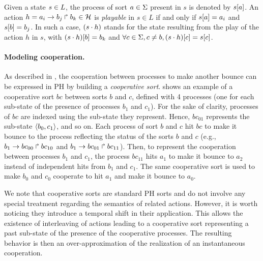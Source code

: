 \noindent
Given a state $s\in L$, the process of sort $a\in\Sigma$ present in $s$ is denoted by ${s[a]}$.
An action $h=a_i\rightarrow b_j\Rsh b_k \in \mathcal{H}$ is \emph{playable} in $s \in L$ if and only if ${s[a]}=a_i$ and ${s[b]} = b_j$.
In such a case, $(s\cdot h)$ stands for the state resulting from the play of the action $h$ in $s$, with
${(s\cdot h)[b]} = b_k$ and $\forall c \in \Sigma, c \neq b, {(s\cdot h)[c]} = {s[c]}$.

\paragraph{Modeling cooperation.}
As described in \cite{PMR10-TCSB}, the cooperation between processes to make another bounce can be
expressed in PH by building a \emph{cooperative sort}.
 shows an example of a cooperative sort $bc$ between sorts $b$ and $c$,
defined with 4 processes (one for each sub-state of the presence of processes $b_1$ and $c_1$).
For the sake of clarity, processes of $bc$ are indexed using the sub-state they represent.
Hence, $bc_{01}$ represents the sub-state $\langle b_0,c_1 \rangle$, and so on.
Each process of sort $b$ and $c$ hit $bc$ to make it bounce to the process reflecting the status of the sorts $b$
and $c$ (e.g., $b_1\rightarrow bc_{00}\Rsh bc_{10}$ and $b_1\rightarrow bc_{01}\Rsh bc_{11}$).
Then, to represent the cooperation between processes $b_1$ and $c_1$,
the process $bc_{11}$ hits $a_1$ to make it bounce to $a_2$ instead of
independent hits from $b_1$ and $c_1$.
The same cooperative sort is used to make $b_0$ and $c_0$ cooperate to hit $a_1$ and make it bounce to $a_0$.

We note that cooperative sorts are standard PH sorts and do not involve any
special treatment regarding the semantics of related actions.
However, it is worth noticing they introduce a temporal shift in their application.
This allows the existence of interleaving of actions leading to a cooperative sort representing a
past sub-state of the presence of the cooperative processes.
The resulting behavior is then an over-approximation
of the realization of an instantaneous cooperation.


